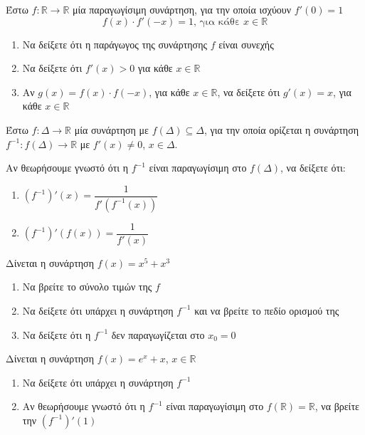 \documentclass{presentation}
\begin{document}
\begin{askisi}
  Έστω $f:\mathbb{R}\to\mathbb{R}$ μία παραγωγίσιμη συνάρτηση, για την οποία ισχύουν $f'(0)=1$
  $$f(x)\cdot f'(-x)=1 \text{, για κάθε } x\in\mathbb{R}$$
  \begin{enumerate}
    \item<1-> Να δείξετε ότι η παράγωγος της συνάρτησης $f$ είναι συνεχής
    \item<2-> Να δείξετε ότι $f'(x)>0$ για κάθε $x\in\mathbb{R}$
    \item<3-> Αν $g(x)=f(x)\cdot f(-x)$, για κάθε $x\in\mathbb{R}$, να δείξετε ότι $g'(x)=x$, για κάθε $x\in\mathbb{R}$
  \end{enumerate}

\end{askisi}

\begin{askisi}
  Έστω $f:Δ\to\mathbb{R}$ μία συνάρτηση με $f(Δ)\subseteq Δ$, για την οποία ορίζεται η συνάρτηση $f^{-1}:f(Δ)\to\mathbb{R}$ με $f'(x)\ne 0$, $x\in Δ$.

  Αν θεωρήσουμε γνωστό ότι η $f^{-1}$ είναι παραγωγίσιμη στο $f(Δ)$, να δείξετε ότι:
  \begin{enumerate}
    \item<1-> $(f^{-1})'(x)=\dfrac{1}{f'(f^{-1}(x))}$
    \item<2-> $(f^{-1})'(f(x))=\dfrac{1}{f'(x)}$
  \end{enumerate}

\end{askisi}

\begin{askisi}
  Δίνεται η συνάρτηση $f(x)=x^5+x^3$
  \begin{enumerate}
    \item<1-> Να βρείτε το σύνολο τιμών της $f$
    \item<2-> Να δείξετε ότι υπάρχει η συνάρτηση $f^{-1}$ και να βρείτε το πεδίο ορισμού της
    \item<3-> Να δείξετε ότι η $f^{-1}$ δεν παραγωγίζεται στο $x_0=0$
  \end{enumerate}

\end{askisi}

\begin{askisi}
  Δίνεται η συνάρτηση $f(x)=e^x+x$, $x\in\mathbb{R}$
  \begin{enumerate}
    \item<1-> Να δείξετε ότι υπάρχει η συνάρτηση $f^{-1}$
    \item<2-> Αν θεωρήσουμε γνωστό ότι η $f^{-1}$ είναι παραγωγίσιμη στο $f(\mathbb{R})=\mathbb{R}$, να βρείτε την $(f^{-1})'(1)$
  \end{enumerate}

\end{askisi}
\end{document}
